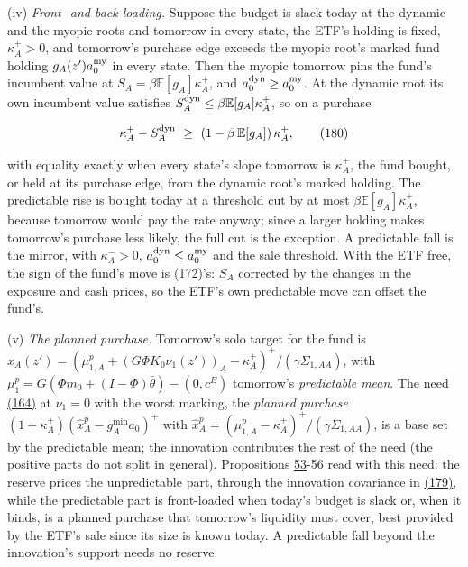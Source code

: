 \documentclass[11pt]{article}
\begin{document}
(iv) \emph{Front- and back-loading.} Suppose the budget is slack today at the
dynamic and the myopic roots and tomorrow in every state, the ETF's
holding is fixed, \(\kappa^+_A>0\), and tomorrow's purchase edge exceeds the
myopic root's marked fund holding \(g_A(z')a^{\rm my}_0\) in every state. Then the
myopic tomorrow pins the fund's incumbent value at \(S_A=\beta\mathbb E[g_A]\kappa^+_A\), and
\(a^{\rm dyn}_0\geq a^{\rm my}_0\). At the dynamic root its own incumbent value satisfies
\(S^{\rm dyn}_A\leq\beta\mathbb E[g_A]\kappa^+_A\), so on a purchase

\begin{equation*}
\kappa^+_A-S^{\rm dyn}_A\ \geq\ (1-\beta\,\mathbb E[g_A])\,\kappa^+_A,\tag{180}\label{eq:180}
\end{equation*}

with equality exactly when every state's slope tomorrow is \(\kappa^+_A\), the
fund bought, or held at its purchase edge, from the dynamic root's
marked holding. The predictable rise is bought today at a threshold cut
by at most \(\beta\mathbb E[g_A]\kappa^+_A\), because tomorrow would pay the rate anyway; since
a larger holding makes tomorrow's purchase less likely, the full cut is
the exception. A predictable fall is the mirror, with \(\kappa^-_A>0\),
\(a^{\rm dyn}_0\leq a^{\rm my}_0\) and the sale threshold. With the ETF free, the sign of the
fund's move is \hyperref[eq:172]{(172)}'s: \(S_A\) corrected by the changes in the exposure and
cash prices, so the ETF's own predictable move can offset the fund's.

(v) \emph{The planned purchase.} Tomorrow's solo target for the fund is
\(\hat x_A(z')=(\mu^p_{1,A}+(G\Phi K_0\nu_1(z'))_A-\kappa^+_A)^+/(\gamma\Sigma_{1,AA})\), with
\(\mu^p_1=G(\Phi m_0+(I-\Phi)\bar\theta)-(0,c^E)\) tomorrow's \emph{predictable mean}. The need \hyperref[eq:164]{(164)}
at \(\nu_1=0\) with the worst marking, the \emph{planned purchase}
\((1+\kappa^+_A)(\hat x^p_A-g^{\min}_Aa_0)^+\) with \(\hat x^p_A=(\mu^p_{1,A}-\kappa^+_A)^+/(\gamma\Sigma_{1,AA})\), is a base set by
the predictable mean; the innovation contributes the rest of the need
(the positive parts do not split in general). Propositions \hyperref[res:Proposition-53]{53}-56 read
with this need: the reserve prices the unpredictable part, through the
innovation covariance in \hyperref[eq:179]{(179)}, while the predictable part is
front-loaded when today's budget is slack or, when it binds, is a
planned purchase that tomorrow's liquidity must cover, best provided by
the ETF's sale since its size is known today. A predictable fall beyond
the innovation's support needs no reserve.
\end{document}
